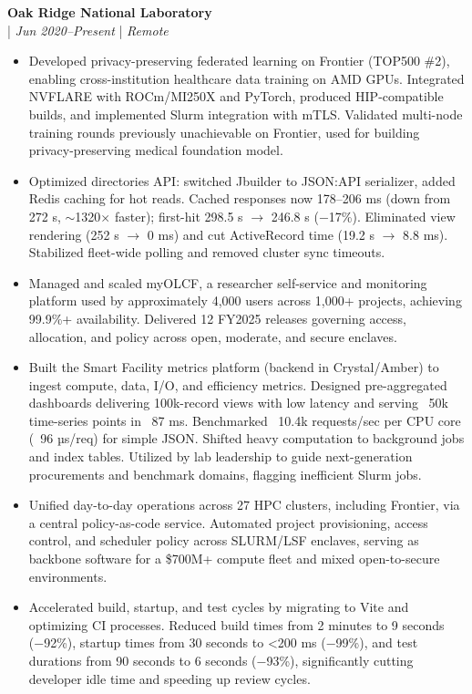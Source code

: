 \documentclass[11pt,a4paper]{article}
\newcommand{\regbullet}[1]{
    \item {\fontsize{10}{12}\selectfont #1}
}
\begin{document}
\noindent\textbf{Oak Ridge National Laboratory}\\
  |  {\fontsize{10}{12}\selectfont\textit{Jun 2020--Present}}  |  {\fontsize{10}{12}\selectfont\textit{Remote}}
\begin{itemize}[leftmargin=18pt,itemsep=1pt,topsep=0pt]
\regbullet{Developed privacy-preserving federated learning on Frontier (TOP500 \#2), enabling cross-institution healthcare data training on AMD GPUs. Integrated NVFLARE with ROCm/MI250X and PyTorch, produced HIP-compatible builds, and implemented Slurm integration with mTLS. Validated multi-node training rounds previously unachievable on Frontier, used for building privacy-preserving medical foundation model.}

\regbullet{Optimized directories API: switched Jbuilder to JSON:API serializer, added Redis caching for hot reads. Cached responses now 178--206 ms (down from 272 s, $\sim$1320$\times$ faster); first-hit 298.5 s $\rightarrow$ 246.8 s ($-$17\%). Eliminated view rendering (252 s $\rightarrow$ 0 ms) and cut ActiveRecord time (19.2 s $\rightarrow$ 8.8 ms). Stabilized fleet-wide polling and removed cluster sync timeouts.}

\regbullet{Managed and scaled myOLCF, a researcher self-service and monitoring platform used by approximately 4,000 users across 1,000+ projects, achieving 99.9\%+ availability. Delivered 12 FY2025 releases governing access, allocation, and policy across open, moderate, and secure enclaves.}

\regbullet{Built the Smart Facility metrics platform (backend in Crystal/Amber) to ingest compute, data, I/O, and efficiency metrics. Designed pre-aggregated dashboards delivering 100k-record views with low latency and serving ~50k time-series points in ~87 ms. Benchmarked ~10.4k requests/sec per CPU core (~96 µs/req) for simple JSON. Shifted heavy computation to background jobs and index tables. Utilized by lab leadership to guide next-generation procurements and benchmark domains, flagging inefficient Slurm jobs.}

\regbullet{Unified day-to-day operations across 27 HPC clusters, including Frontier, via a central policy-as-code service. Automated project provisioning, access control, and scheduler policy across SLURM/LSF enclaves, serving as backbone software for a \$700M+ compute fleet and mixed open-to-secure environments.}

\regbullet{Accelerated build, startup, and test cycles by migrating to Vite and optimizing CI processes. Reduced build times from 2 minutes to 9 seconds (−92\%), startup times from 30 seconds to <200 ms (−99\%), and test durations from 90 seconds to 6 seconds (−93\%), significantly cutting developer idle time and speeding up review cycles.}

\end{itemize}
\end{document}
